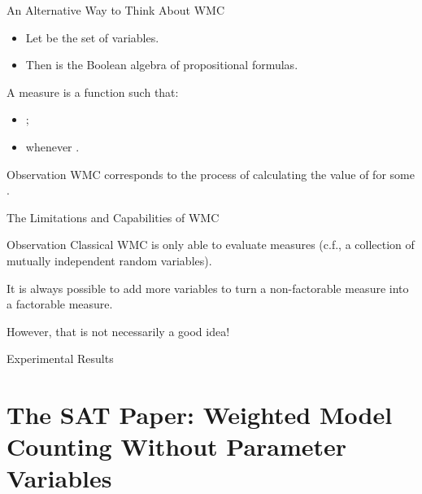 \documentclass{beamer}
\begin{document}
\begin{frame}{An Alternative Way to Think About WMC}
  \begin{itemize}
  \item Let  be the set of variables.
  \item Then  is the Boolean algebra of propositional
    formulas.
  \end{itemize}
  \begin{definition}
    A \alert{measure} is a function  such that:
    \begin{itemize}
    \item {};
    \item {} whenever .
    \end{itemize}
  \end{definition}
  \begin{block}{Observation}
    WMC corresponds to the process of calculating the value of
     for some .
  \end{block}
\end{frame}

\begin{frame}{The Limitations and Capabilities of WMC}
  \begin{alertblock}{Observation}
    Classical WMC is only able to evaluate  measures
    (c.f., a collection of mutually independent random variables).
  \end{alertblock}
  \begin{theorem}
    It is always possible to add more variables to turn a non-factorable measure
    into a factorable measure.
  \end{theorem}
  However, that is not necessarily a good idea!
\end{frame}

\begin{frame}{Experimental Results}
  \centering
  
\end{frame}

\section{The SAT Paper: Weighted Model Counting Without Parameter Variables}
\end{document}
